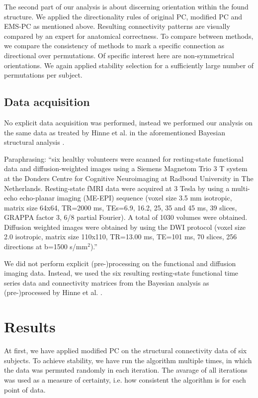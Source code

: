 \documentclass[a4paper, 10pt, english, onecolumn]{article}
\begin{document}
The second part of our analysis is about discerning orientation within the found structure.
We applied the directionality rules of original PC, modified PC and EMS-PC as mentioned above.
Resulting connectivity patterns are visually compared by an expert for anatomical correctness.
To compare between methods, we compare the consistency of methods to mark a specific connection as directional over permutations.
Of specific interest here are non-symmetrical orientations.
We again applied stability selection for a sufficiently large number of permutations per subject.

\subsection{Data acquisition}
No explicit data acquisition was performed, instead we performed our analysis on the same data as treated by Hinne et al. in the aforementioned Bayesian structural analysis \cite{hinne2013, hinne2013structfunc}.

Paraphrasing: ``six healthy volunteers were scanned for resting-state functional data and diffusion-weighted images using a Siemens Magnetom Trio 3 T system at the Donders Centre for Cognitive Neuroimaging at Radboud University in The Netherlands.
Resting-state fMRI data were acquired at 3 Tesla by using a multi-echo echo-planar imaging (ME-EPI) sequence (voxel size 3.5 mm isotropic, matrix size 64x64, TR=2000 ms, TEs=6.9, 16.2, 25, 35 and 45 ms, 39 slices, GRAPPA factor 3, 6/8 partial Fourier).
A total of 1030 volumes were obtained.
Diffusion weighted images were obtained by using the DWI protocol (voxel size 2.0 isotropic, matrix size 110x110, TR=13.00 ms, TE=101 ms, 70 slices, 256 directions at b=1500 s/mm$^2$).''

We did not perform explicit (pre-)processing on the functional and diffusion imaging data.
Instead, we used the six resulting resting-state functional time series data and connectivity matrices from the Bayesian analysis as (pre-)processed by Hinne et al. \cite{hinne2013}.

\section{Results}
At first, we have applied modified PC on the structural connectivity data of six subjects.
To achieve stability, we have run the algorithm multiple times, in which the data was permuted randomly in each iteration.
The avarage of all iterations was used as a measure of certainty, i.e. how consistent the algorithm is for each point of data.
\end{document}
